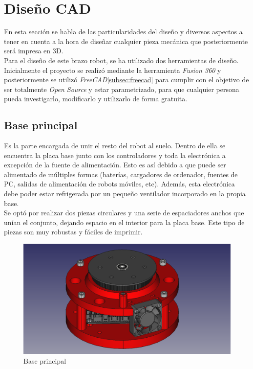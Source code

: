 \newpage
\section{Diseño CAD}
\label{sec:di_cad}
\noindent En esta sección se habla de las particularidades del diseño y diversos aspectos a tener en cuenta a la hora de diseñar 
cualquier pieza mecánica que posteriormente será impresa en 3D. 
\\
Para el diseño de este brazo robot, se ha utilizado dos herramientas de diseño. Inicialmente el proyecto se realizó mediante 
la herramienta \textit{Fusion 360} y posteriormente se utilizó \textit{FreeCAD}\ref{subsec:freecad} para cumplir con el objetivo de ser totalmente 
\textit{Open Source} y estar parametrizado, para que cualquier persona pueda investigarlo, modificarlo y utilizarlo de forma gratuita.

\subsection{Base principal}
\noindent Es la parte encargada de unir el resto del robot al suelo. Dentro de ella se encuentra la placa base junto con los controladores 
y toda la electrónica a excepción de la fuente de alimentación. Esto es así debido a que puede ser alimentado de múltiples formas (baterías, 
cargadores de ordenador, fuentes de PC, salidas de alimentación de robots móviles, etc). Además, esta electrónica debe poder estar refrigerada 
por un pequeño ventilador incorporado en la propia base. \\
Se optó por realizar dos piezas circulares y una serie de espaciadores anchos que unían el conjunto, dejando espacio en el interior para 
la placa base. Este tipo de piezas son muy robustas y fáciles de imprimir. 
\begin{figure} [ht!]
  \begin{center}
    \includegraphics[width=12cm]{figs/base_principal.png}
  \end{center}
  \caption{Base principal}
\end{figure}\ 

